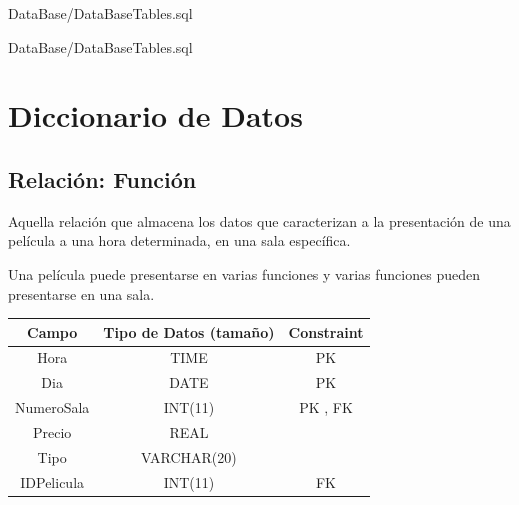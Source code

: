 \documentclass[12pt, fleqn]{report}                             %
\begin{document}
            
            {DataBase/DataBaseTables.sql}
            \clearpage

            
            {DataBase/DataBaseTables.sql}



    \clearpage
    \section{Diccionario de Datos}


        \subsection*{Relación: Función}

            Aquella relación que almacena los datos que caracterizan a la presentación
            de una película a una hora determinada, en una sala específica.

            Una película puede presentarse en varias funciones y varias funciones pueden
            presentarse en una sala.

            \vspace{2em}

            \small{
            \begin{tabular}{| c | c | c |}
                \hline
                \textbf{Campo} & \textbf{Tipo de Datos (tamaño)} & \textbf{Constraint} \\[0.5ex] 
                \hline\hline
                
                Hora        & TIME          & PK                        \\
                Dia         & DATE          & PK                        \\
                NumeroSala  & INT(11)       & PK , FK                   \\
                Precio      & REAL          &                           \\
                Tipo        & VARCHAR(20)   &                           \\
                IDPelicula  & INT(11)       & FK                        \\
                \hline
            \end{tabular}
            }
\end{document}
